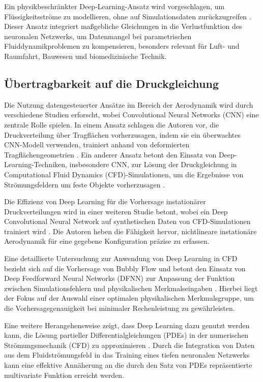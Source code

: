 Ein physikbeschränkter Deep-Learning-Ansatz wird vorgeschlagen, um Flüssigkeitsströme zu modellieren, ohne auf Simulationsdaten zurückzugreifen \parencite{sunSurrogateModelingFluid2020a}. Dieser Ansatz integriert maßgebliche Gleichungen in die Verlustfunktion des neuronalen Netzwerks, um Datenmangel bei parametrischen Fluiddynamikproblemen zu kompensieren, besonders relevant für Luft- und Raumfahrt, Bauwesen und biomedizinische Technik.

\subsection{Übertragbarkeit auf die Druckgleichung}
Die Nutzung datengesteuerter Ansätze im Bereich der Aerodynamik wird durch verschiedene Studien erforscht, wobei Convolutional Neural Networks (CNN) eine zentrale Rolle spielen. In einem Ansatz schlagen die Autoren vor, die Druckverteilung über Tragflächen vorherzusagen, indem sie ein überwachtes CNN-Modell verwenden, trainiert anhand von deformierten Tragflächengeometrien \parencite{huiFastPressureDistribution2020}. Ein anderer Ansatz betont den Einsatz von Deep-Learning-Techniken, insbesondere CNN, zur Lösung der Druckgleichung in Computational Fluid Dynamics (CFD)-Simulationen, um die Ergebnisse von Strömungsfeldern um feste Objekte vorherzusagen \parencite{abucide-armasDataAugmentationBasedTechnique2021}.

Die Effizienz von Deep Learning für die Vorhersage instationärer Druckverteilungen wird in einer weiteren Studie betont, wobei ein Deep Convolutional Neural Network auf synthetischen Daten von CFD-Simulationen trainiert wird \parencite{rozovDatadrivenPredictionUnsteady2021}. Die Autoren heben die Fähigkeit hervor, nichtlineare instationäre Aerodynamik für eine gegebene Konfiguration präzise zu erfassen.

Eine detaillierte Untersuchung zur Anwendung von Deep Learning in CFD bezieht sich auf die Vorhersage von Bubbly Flow und betont den Einsatz von Deep Feedforward Neural Networks (DFNN) zur Anpassung der Funktion zwischen Simulationsfehlern und physikalischen Merkmalseingaben \parencite{baoComputationallyEfficientCFD2020}. Hierbei liegt der Fokus auf der Auswahl einer optimalen physikalischen Merkmalsgruppe, um die Vorhersagegenauigkeit bei minimaler Rechenleistung zu gewährleisten.

Eine weitere Herangehensweise zeigt, dass Deep Learning dazu genutzt werden kann, die Lösung partieller Differentialgleichungen (PDEs) in der numerischen Strömungsmechanik (CFD) zu approximieren \parencite{josephMeshBasedNeural2022}. Durch die Integration von Daten aus dem Fluidströmungsfeld in das Training eines tiefen neuronalen Netzwerks kann eine effektive Annäherung an die durch den Satz von PDEs repräsentierte multivariate Funktion erreicht werden.